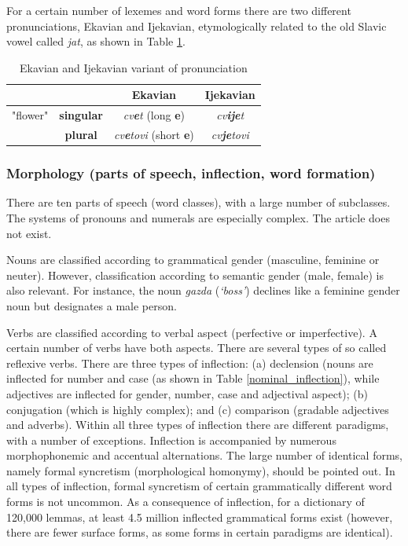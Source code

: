 {\begin{multicols}{2}
For a certain number of lexemes and word forms there are two different pronunciations, Ekavian and Ijekavian, etymologically related to the old Slavic vowel called \textit{jat}, as shown in Table \ref{ekavian_and_ijekavian}. 

\begin{table}[ht]
\begin{center}
\begin{tabular}{|c|c|c|c|}
 \hline
  \multicolumn{2}{|c|}{} & {\textbf{Ekavian}} & {\textbf{Ijekavian}} \\ 
   \hline
  {"flower"} & \textbf{singular} & \textit{cv\textbf{e}t} (long \textbf{e}) & \textit{cv\textbf{ije}t}\\ 
   \cline{2-4}
     & \textbf{plural} & \textit{cv\textbf{e}tovi} (short \textbf{e}) & \textit{cv\textbf{je}tovi} \\
  \hline
 \end{tabular}
\end{center}
\caption{Ekavian and Ijekavian variant of pronunciation}
\label{ekavian_and_ijekavian}
\end{table}


\subsubsection {Morphology (parts of speech, inflection, word formation)}

There are ten parts of speech (word classes), with a large number of subclasses. The systems of pronouns and numerals are especially complex. The article does not exist.

Nouns are classified according to grammatical gender (masculine, feminine or neuter). However, classification according to semantic gender (male, female) is also relevant. For instance, the noun \textit{gazda} (\textit{‘boss’}) declines like a feminine gender noun but designates a male person.  

Verbs are classified according to verbal aspect (perfective or imperfective). A certain number of verbs have both aspects. There are several types of so called reflexive verbs.
There are three types of inflection: (a) declension (nouns are inflected for number and case (as shown in Table \ref{nominal_inflection}), while adjectives are inflected for gender, number, case and adjectival aspect); (b) conjugation (which is highly complex); and (c) comparison (gradable adjectives and adverbs). Within all three types of inflection there are different paradigms, with a number of exceptions. Inflection is accompanied by numerous morphophonemic and accentual alternations. The large number of identical forms, namely formal syncretism (morphological homonymy), should be pointed out. In all types of inflection, formal syncretism of certain grammatically different word forms is not uncommon. As a consequence of inflection, for a dictionary of 120,000 lemmas, at least 4.5 million inflected grammatical forms exist (however, there are fewer surface forms, as some forms in certain paradigms are identical).


\end{multicols}}
